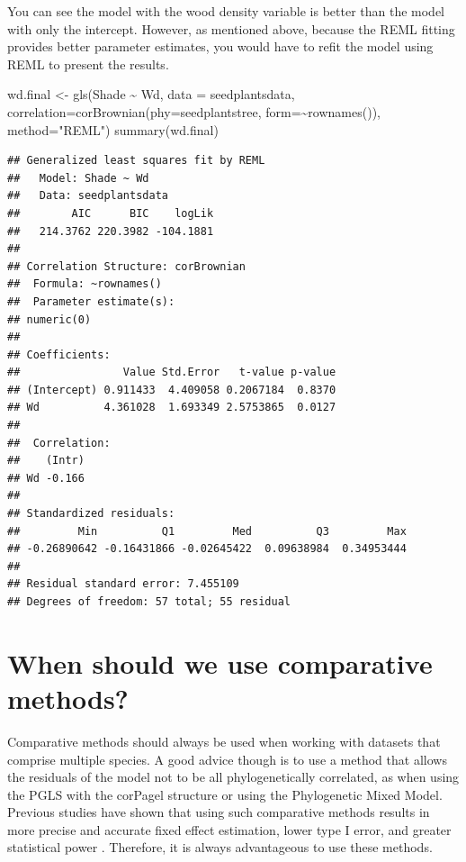\documentclass[
]{book}
\newenvironment{Shaded}{\begin{snugshade}}{\end{snugshade}}
\newcommand{\AttributeTok}[1]{\textcolor[rgb]{0.77,0.63,0.00}{#1}}
\newcommand{\FunctionTok}[1]{\textcolor[rgb]{0.00,0.00,0.00}{#1}}
\newcommand{\NormalTok}[1]{#1}
\newcommand{\OtherTok}[1]{\textcolor[rgb]{0.56,0.35,0.01}{#1}}
\newcommand{\SpecialCharTok}[1]{\textcolor[rgb]{0.00,0.00,0.00}{#1}}
\newcommand{\StringTok}[1]{\textcolor[rgb]{0.31,0.60,0.02}{#1}}
\begin{document}
You can see the model with the wood density variable is better than the model with only the intercept. However, as mentioned above, because the REML fitting provides better parameter estimates, you would have to refit the model using REML to present the results.

\begin{Shaded}
\begin{Highlighting}[]
\NormalTok{wd.final }\OtherTok{\textless{}{-}} \FunctionTok{gls}\NormalTok{(Shade }\SpecialCharTok{\textasciitilde{}}\NormalTok{ Wd, }\AttributeTok{data =}\NormalTok{ seedplantsdata,}
                \AttributeTok{correlation=}\FunctionTok{corBrownian}\NormalTok{(}\AttributeTok{phy=}\NormalTok{seedplantstree, }\AttributeTok{form=}\SpecialCharTok{\textasciitilde{}}\FunctionTok{rownames}\NormalTok{()), }
                \AttributeTok{method=}\StringTok{"REML"}\NormalTok{)}
\FunctionTok{summary}\NormalTok{(wd.final)}
\end{Highlighting}
\end{Shaded}

\begin{verbatim}
## Generalized least squares fit by REML
##   Model: Shade ~ Wd 
##   Data: seedplantsdata 
##        AIC      BIC    logLik
##   214.3762 220.3982 -104.1881
## 
## Correlation Structure: corBrownian
##  Formula: ~rownames() 
##  Parameter estimate(s):
## numeric(0)
## 
## Coefficients:
##                Value Std.Error   t-value p-value
## (Intercept) 0.911433  4.409058 0.2067184  0.8370
## Wd          4.361028  1.693349 2.5753865  0.0127
## 
##  Correlation: 
##    (Intr)
## Wd -0.166
## 
## Standardized residuals:
##         Min          Q1         Med          Q3         Max 
## -0.26890642 -0.16431866 -0.02645422  0.09638984  0.34953444 
## 
## Residual standard error: 7.455109 
## Degrees of freedom: 57 total; 55 residual
\end{verbatim}

\hypertarget{when-should-we-use-comparative-methods}{%
\chapter{When should we use comparative methods?}\label{when-should-we-use-comparative-methods}}

Comparative methods should always be used when working with datasets that comprise multiple species. A good advice though is to use a method that allows the residuals of the model not to be all phylogenetically correlated, as when using the PGLS with the corPagel structure or using the Phylogenetic Mixed Model. Previous studies have shown that using such comparative methods results in more precise and accurate fixed effect estimation, lower type I error, and greater statistical power \citep{revell2010phylogenetic}. Therefore, it is always advantageous to use these methods.
\end{document}
